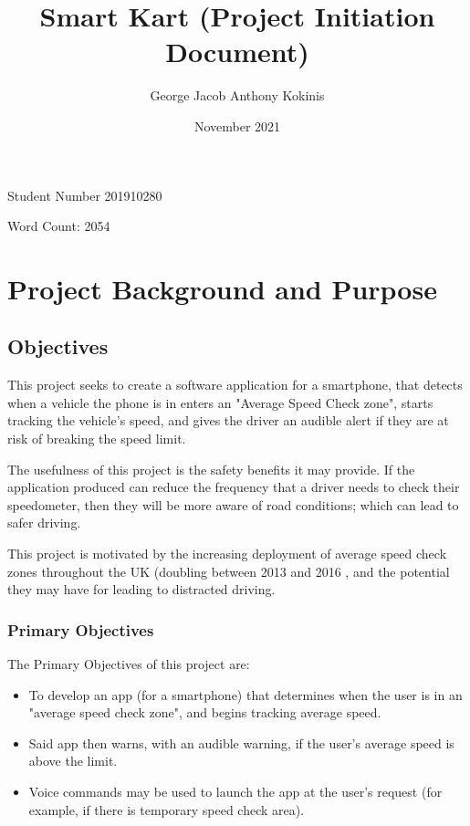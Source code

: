 \documentclass[11pt, a4paper, notitlepage]{report}
\title{Smart Kart (Project Initiation Document)}
\date{November 2021}
\author{George Jacob Anthony Kokinis}
\begin{document}
\maketitle
\begin{center}
    Student Number 201910280
    
    Word Count: 2054 %
\end{center}
\newpage

\tableofcontents

\chapter{Project Background and Purpose}
\section{Objectives}
This project seeks to create a software application for a smartphone, that 
detects when a vehicle the phone is in enters an "Average Speed Check zone", 
starts tracking the vehicle's speed, and gives the driver an audible alert if 
they are at risk of breaking the speed limit.

The usefulness of this project is the safety benefits it may provide. If the 
application produced can reduce the frequency that a driver needs to check 
their speedometer, then they will be more aware of road conditions; which can 
lead to safer driving.

This project is motivated by the increasing deployment of average speed check 
zones throughout the UK (doubling between 2013 and 2016 
\citep{BBCSpeedCameraDoubled}, and the potential they may have for leading to 
distracted driving.

\subsection{Primary Objectives}\label{subsec:PrimaryObjectives}
The Primary Objectives of this project are:
\begin{itemize}
    \item To develop an app (for a smartphone) that determines when the user is 
    in an "average speed check zone", and begins tracking average speed.
    \item Said app then warns, with an audible warning, if the user's average 
    speed is above the limit.
    \item Voice commands may be used to launch the app at the user's request 
    (for example, if there is temporary speed check area).
\end{itemize}
\end{document}
